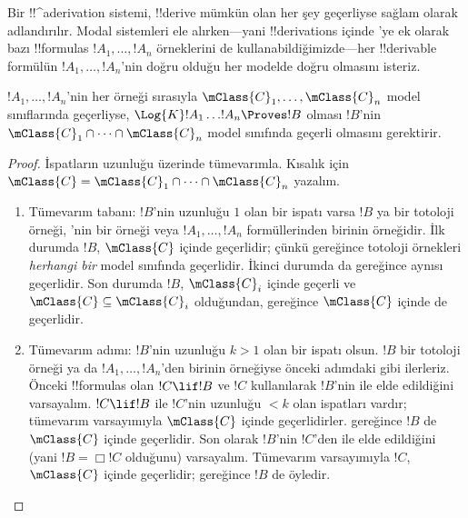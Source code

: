 \documentclass[../../../include/open-logic-section]{subfiles}
\begin{document}


Bir !!^a{derivation} sistemi, !!{derive} mümkün olan her şey geçerliyse sağlam
olarak adlandırılır. Modal sistemleri ele alırken---yani !!{derivation}s
içinde 'ye ek olarak bazı !!{formula}s $!A_1,\dots,!A_n$ örneklerini
de kullanabildiğimizde---her !!{derivable} formülün
$!A_1,\dots,!A_n$'nin doğru olduğu her modelde doğru olmasını isteriz.

\begin{thm}
  $!A_1,\dots,!A_n$'nin her örneği sırasıyla
  $\mClass{C}_1,\dots,\mClass{C}_n$ model sınıflarında geçerliyse,
  $\Log{K}!A_1\dots !A_n\Proves !B$ olması $!B$'nin
  $\mClass{C}_1\cap\dots\cap\mClass{C}_n$ model sınıfında geçerli olmasını
  gerektirir.
\end{thm}

\begin{proof}
  İspatların uzunluğu üzerinde tümevarımla. Kısalık için
  $\mClass{C}=\mClass{C}_1\cap\dots\cap\mClass{C}_n$ yazalım.
  \begin{enumerate}
  \item Tümevarım tabanı: $!B$'nin uzunluğu $1$ olan bir ispatı varsa $!B$
    ya bir totoloji örneği, 'nin
    bir örneği veya $!A_1,\dots,!A_n$ formüllerinden birinin örneğidir.
    İlk durumda $!B$, $\mClass{C}$ içinde geçerlidir; çünkü
     gereğince totoloji örnekleri
    \emph{herhangi bir} model sınıfında geçerlidir. İkinci durumda da
     gereğince aynısı geçerlidir.
    Son durumda $!B$, $\mClass{C}_i$ içinde geçerli ve
    $\mClass{C}\subseteq\mClass{C}_i$ olduğundan,
     gereğince $\mClass{C}$ içinde de
    geçerlidir.
  \item Tümevarım adımı: $!B$'nin uzunluğu $k>1$ olan bir ispatı olsun.
    $!B$ bir totoloji örneği ya da $!A_1,\dots,!A_n$'den birinin örneğiyse
    önceki adımdaki gibi ilerleriz. Önceki !!{formula}s olan
    $!C\lif !B$ ve $!C$ kullanılarak $!B$'nin \MP{} ile elde edildiğini varsayalım.
    $!C\lif !B$ ile $!C$'nin uzunluğu $<k$ olan ispatları vardır; tümevarım varsayımıyla
    $\mClass{C}$ içinde geçerlidirler. 
    gereğince $!B$ de $\mClass{C}$ içinde geçerlidir. Son olarak $!B$'nin
    $!C$'den \Nec{} ile elde edildiğini (yani $!B=\Box!C$ olduğunu)
    varsayalım. Tümevarım varsayımıyla $!C$, $\mClass{C}$ içinde geçerlidir;
     gereğince $!B$ de öyledir.
  \end{enumerate}
\end{proof}
\end{document}
